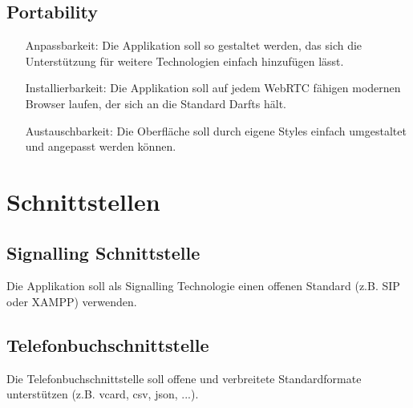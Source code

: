 
\subsection{Portability}
\begin{itemize}
	\item[Anpassbarkeit:] Die Applikation soll so gestaltet werden, das sich die Unterstützung für weitere Technologien einfach hinzufügen lässt.
	\item[Installierbarkeit:] Die Applikation soll auf jedem WebRTC fähigen modernen Browser laufen, der sich an die Standard Darfts hält.
	\item[Austauschbarkeit:] Die Oberfläche soll durch eigene Styles einfach umgestaltet und angepasst werden können.
\end{itemize}


\section{Schnittstellen}

\subsection{Signalling Schnittstelle}
Die Applikation soll als Signalling Technologie einen offenen Standard (z.B. SIP oder XAMPP) verwenden.

\subsection{Telefonbuchschnittstelle}
Die Telefonbuchschnittstelle soll offene und verbreitete Standardformate unterstützen (z.B. vcard, csv, json, ...).
